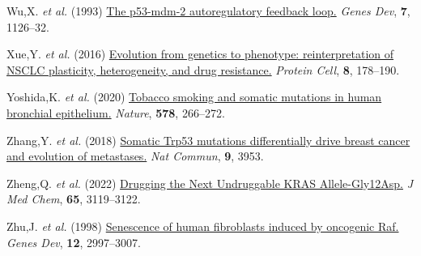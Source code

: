 \begin{CSLReferences}{1}{0}
\leavevmode{}%
Wu,X. \emph{et al.} (1993) \href{https://doi.org/10.1101/gad.7.7a.1126}{The p53-mdm-2 autoregulatory feedback loop.} \emph{Genes Dev}, \textbf{7}, 1126--32.

\leavevmode{}%
Xue,Y. \emph{et al.} (2016) \href{https://doi.org/10.1007/s13238-016-0330-1}{Evolution from genetics to phenotype: reinterpretation of NSCLC plasticity, heterogeneity, and drug resistance.} \emph{Protein Cell}, \textbf{8}, 178--190.

\leavevmode{}%
Yoshida,K. \emph{et al.} (2020) \href{https://doi.org/10.1038/s41586-020-1961-1}{Tobacco smoking and somatic mutations in human bronchial epithelium.} \emph{Nature}, \textbf{578}, 266--272.

\leavevmode{}%
Zhang,Y. \emph{et al.} (2018) \href{https://doi.org/10.1038/s41467-018-06146-9}{Somatic Trp53 mutations differentially drive breast cancer and evolution of metastases.} \emph{Nat Commun}, \textbf{9}, 3953.

\leavevmode{}%
Zheng,Q. \emph{et al.} (2022) \href{https://doi.org/10.1021/acs.jmedchem.2c00099}{Drugging the Next Undruggable KRAS Allele-Gly12Asp.} \emph{J Med Chem}, \textbf{65}, 3119--3122.

\leavevmode{}%
Zhu,J. \emph{et al.} (1998) \href{https://doi.org/10.1101/gad.12.19.2997}{Senescence of human fibroblasts induced by oncogenic Raf.} \emph{Genes Dev}, \textbf{12}, 2997--3007.

\end{CSLReferences}
